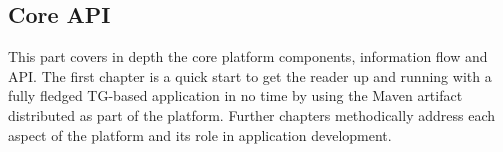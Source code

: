 \begin{partbacktext}
\part{Core API}  
  This part covers in depth the core platform components, information flow and API.
  The first chapter is a quick start to get the reader up and running with a fully fledged TG-based application in no time by using the Maven artifact distributed as part of the platform.
  Further chapters methodically address each aspect of the platform and its role in application development.
\end{partbacktext}
